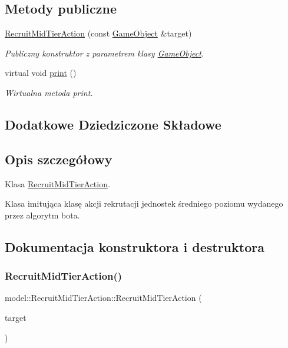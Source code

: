 \subsection*{Metody publiczne}
\begin{DoxyCompactItemize}
\item 
\hyperlink{classmodel_1_1RecruitMidTierAction_ad7447d08f444b49081a0294686cb47c7}{Recruit\+Mid\+Tier\+Action} (const \hyperlink{classmodel_1_1GameObject}{Game\+Object} \&target)
\begin{DoxyCompactList}\small\item\em Publiczny konstruktor z parametrem klasy \hyperlink{classmodel_1_1GameObject}{Game\+Object}. \end{DoxyCompactList}\item 
virtual void \hyperlink{classmodel_1_1RecruitMidTierAction_a91d571781540c34eea70643518e4a33d}{print} ()
\begin{DoxyCompactList}\small\item\em Wirtualna metoda print. \end{DoxyCompactList}\end{DoxyCompactItemize}
\subsection*{Dodatkowe Dziedziczone Składowe}


\subsection{Opis szczegółowy}
Klasa \hyperlink{classmodel_1_1RecruitMidTierAction}{Recruit\+Mid\+Tier\+Action}. 

Klasa imitująca klasę akcji rekrutacji jednostek średniego poziomu wydanego przez algorytm bota. 

\subsection{Dokumentacja konstruktora i destruktora}
\mbox{\label{classmodel_1_1RecruitMidTierAction_ad7447d08f444b49081a0294686cb47c7}} 
\subsubsection{\texorpdfstring{Recruit\+Mid\+Tier\+Action()}{RecruitMidTierAction()}}
{\footnotesize\ttfamily model\+::\+Recruit\+Mid\+Tier\+Action\+::\+Recruit\+Mid\+Tier\+Action (\begin{DoxyParamCaption}\item[{const \hyperlink{classmodel_1_1GameObject}{Game\+Object} \&}]{target }\end{DoxyParamCaption})\hspace{0.3cm}{\ttfamily [inline]}}



